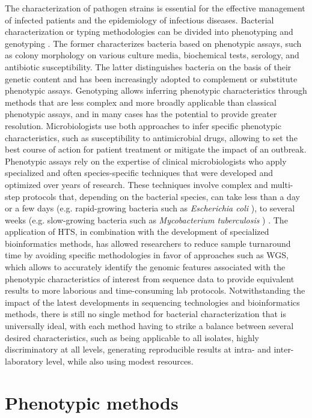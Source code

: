 The characterization of pathogen strains is essential for the effective management of infected patients and the epidemiology of infectious diseases. Bacterial characterization or typing methodologies can be divided into phenotyping and genotyping \cite{li_bacterial_2009}. The former characterizes bacteria based on phenotypic assays, such as colony morphology on various culture media, biochemical tests, serology, and antibiotic susceptibility. The latter distinguishes bacteria on the basis of their genetic content and has been increasingly adopted to complement or substitute phenotypic assays. Genotyping allows inferring phenotypic characteristics through methods that are less complex and more broadly applicable than classical phenotypic assays, and in many cases has the potential to provide greater resolution. Microbiologists use both approaches to infer specific phenotypic characteristics, such as susceptibility to antimicrobial drugs, allowing to set the best course of action for patient treatment or mitigate the impact of an outbreak. Phenotypic assays rely on the expertise of clinical microbiologists who apply specialized and often species-specific techniques that were developed and optimized over years of research. These techniques involve complex and multi-step protocols that, depending on the bacterial species, can take less than a day or a few days (e.g. rapid-growing bacteria such as \textit{Escherichia coli} \cite{son_growth_2021}), to several weeks (e.g. slow-growing bacteria such as \textit{Mycobacterium tuberculosis} \cite{gordon_microbe_2018}) \cite{didelot_transforming_2012}. The application of \ac{HTS}, in combination with the development of specialized bioinformatics methods, has allowed researchers to reduce sample turnaround time by avoiding specific methodologies in favor of approaches such as \ac{WGS}, which allows to accurately identify the genomic features associated with the phenotypic characteristics of interest from sequence data to provide equivalent results to more laborious and time-consuming lab protocols. Notwithstanding the impact of the latest developments in sequencing technologies and bioinformatics methods, there is still no single method for bacterial characterization that is universally ideal, with each method having to strike a balance between several desired characteristics, such as being applicable to all isolates, highly discriminatory at all levels, generating reproducible results at intra- and inter-laboratory level, while also using modest resources.

\section{Phenotypic methods}

